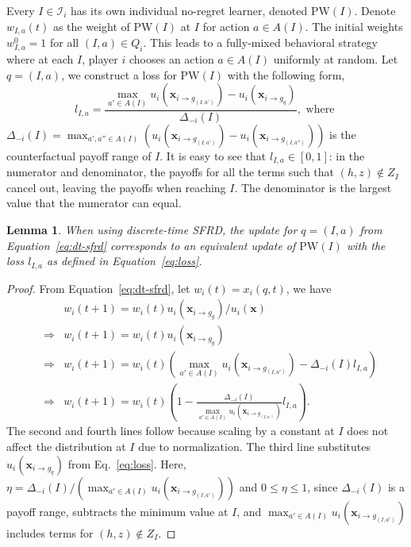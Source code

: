 \documentclass{aamas2014}
\newcommand{\bx}{\mathbf{x}}
\newcommand{\cI}{\mathcal{I}}
\newcommand{\PW}{\mbox{PW}}
\newtheorem{lemma}{Lemma}
\begin{document}
Every $I \in \cI_i$ has its own individual no-regret learner, denoted $\PW(I)$. 
Denote $w_{I,a}(t)$ as the weight of $\PW(I)$ at $I$ for action $a \in A(I)$. 
The initial weights $w^0_{I,a} = 1$ for all $(I,a) \in Q_i$. 
This leads to a fully-mixed behavioral strategy where at each $I$, player $i$ chooses an action 
$a \in A(I)$ uniformly at random.
Let $q = (I,a)$, we construct a loss for $\PW(I)$ with the following form,
\begin{equation}
\label{eq:loss}
l_{I,a} = \frac{\max_{a' \in A(I)} u_i(\bx_{i \rightarrow g_{(I,a')}}) - u_i(\bx_{i \rightarrow g_q})}{\Delta_{-i}(I)}, \mbox{ where }
\end{equation}
$\Delta_{-i}(I) =  \max_{a', a'' \in A(I)} ( u_i(\bx_{i \rightarrow g_{(I,a')}}) - u_i(\bx_{i \rightarrow g_{(I,a'')}}) )$ 
is the counterfactual payoff range of $I$. 
It is easy to see that $l_{I,a} \in [0,1]$: in the numerator and denominator, the payoffs for all the terms such that $(h,z) \not\in Z_I$ 
cancel out, leaving the payoffs when reaching $I$. The denominator is the largest value that the numerator can equal. 


\begin{lemma}
When using discrete-time SFRD, the update for $q = (I,a)$ from Equation~\ref{eq:dt-sfrd} corresponds to an equivalent update 
of $\PW(I)$ with the loss $l_{I,a}$ as defined in Equation~\ref{eq:loss}.
\end{lemma}
\begin{proof}
From Equation~\ref{eq:dt-sfrd}, let $w_i(t) = x_i(q,t)$, we have
\begin{eqnarray*}
  &             & w_i(t+1) = w_i(t) u_i(\bx_{i \rightarrow g_g}) / u_i(\bx) \\
  & \Rightarrow & w_i(t+1) = w_i(t) u_i(\bx_{i \rightarrow g_g}) \\
  & \Rightarrow & w_i(t+1) = w_i(t) (\max_{a' \in A(I)} u_i(\bx_{i \rightarrow g_{(I,a')}}) - \Delta_{-i}(I) l_{I,a}) \\   
  & \Rightarrow & w_i(t+1) = w_i(t) (1 - \frac{\Delta_{-i}(I)}{\max_{a' \in A(I)} u_i(\bx_{i \rightarrow g_{(I,a')}})} l_{I,a}).
\end{eqnarray*}
The second and fourth lines follow because scaling by a constant at $I$ does not affect the distribution at $I$ due to normalization.
The third line substitutes $u_i(\bx_{i \rightarrow g_q})$ from Eq.~\ref{eq:loss}. 
Here, $\eta = \Delta_{-i}(I) / ({\max_{a' \in A(I)} u_i(\bx_{i \rightarrow g_{(I,a')}})})$ and $0 \le \eta \le 1$, since $\Delta_{-i}(I)$
is a payoff range, subtracts the minimum value at $I$, 
and ${\max_{a' \in A(I)} u_i(\bx_{i \rightarrow g_{(I,a')}})}$ includes terms for $(h,z) \not\in Z_I$.
\end{proof}
\end{document}
